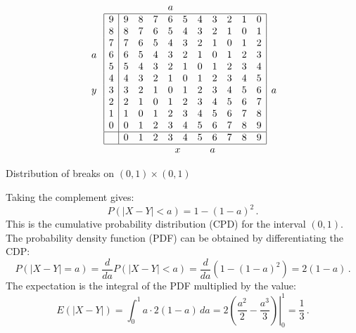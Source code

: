 \begin{table}[bt]
\[
\begin{array}{c}
\quad\\\\\\
a\\\\
\quad\\
y\\
\quad\\\quad\\\quad\\\quad
\end{array}
\begin{array}{|c|cccccccccc|}
\multicolumn{11}{l}{\qquad \qquad \qquad a}\\
\hline
9& 9 & 8 & 7 & 6 & 5 & 4 & 3 & 2 & 1 & 0  \\
8& 8 & 7 & 6 & 5 & 4 & 3 & 2 & 1 & 0 & 1  \\
7& 7 & 6 & 5 & 4 & 3 & 2 & 1 & 0 & 1 & 2  \\
6& 6 & 5 & 4 & 3 & 2 & 1 & 0 & 1 & 2 & 3  \\
5& 5 & 4 & 3 & 2 & 1 & 0 & 1 & 2 & 3 & 4  \\
4& 4 & 3 & 2 & 1 & 0 & 1 & 2 & 3 & 4 & 5  \\
3& 3 & 2 & 1 & 0 & 1 & 2 & 3 & 4 & 5 & 6  \\
2& 2 & 1 & 0 & 1 & 2 & 3 & 4 & 5 & 6 & 7  \\
1& 1 & 0 & 1 & 2 & 3 & 4 & 5 & 6 & 7 & 8  \\
0& 0 & 1 & 2 & 3 & 4 & 5 & 6 & 7 & 8 & 9  \\
\hline
&0 & 1 & 2 & 3 & 4 & 5 & 6 & 7 & 8 & 9  \\
\hline
\multicolumn{11}{c}{\quad \quad x\quad\quad\quad a}
\end{array}
\begin{array}{c}
\\\\\\
a\\\\
\end{array}
\]
\caption{Distribution of breaks on $(0,1)\times (0,1)$}\label{t.rods}
\end{table}

Taking the complement gives:
\[
P(|X-Y|<a)=1-(1-a)^2\,.
\]
This is the cumulative probability distribution (CPD) for the interval $(0,1)$. The probability density function (PDF) can be obtained by differentiating the CDP:
\[
P(|X-Y|=a)= \frac{d}{da}P(|X-Y|<a) =
  \frac{d}{da}(1-(1-a)^2)=2(1-a)\,.
\]
The expectation is the integral of the PDF multiplied by the value:
\[
E(|X-Y|)= \int_{0}^{1} a\cdot2(1-a)\, da=
  2\left.\left(\frac{a^2}{2}-\frac{a^3}{3}\right)\right|_0^1=\frac{1}{3}\,.
\]

